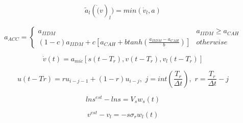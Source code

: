 \documentclass[11pt]{article}
\begin{document}
$$\tilde{a}_l(\dot(v)_l) = min(\dot{v}_l, a)$$

$$a_{ACC}= \begin{cases}
a_{IIDM} & a_{IIDM} \ge a_{CAH}\\
(1-c)a_{IIDM} + c\left[a_{CAH} + b tanh(\frac{a_{IIDM}-a_{CAH}}{b}) \right] & otherwise
\end{cases}$$

$$\dot{v}(t) = a_{mic}\left[s(t-T_r), v(t-T_r), v_l(t-T_r) \right]$$

$$u(t-Tr) = ru_{i-j-1} + (1-r)u_{i-j},  \, \, j = int\left(\frac{T_r}{\Delta t} \right), \, \, r = \frac{T_r}{\Delta t} - j$$

$$ln s^{est} - ln s = V_s w_s(t) $$

$$v^{est} - v_l = -s \sigma_r w_l(t)$$

%
%
%
%
%
\end{document}

